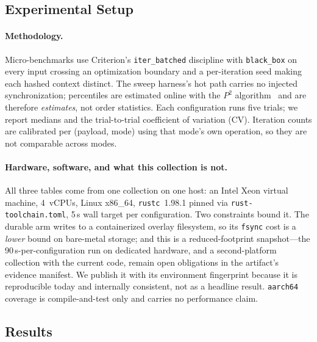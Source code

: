 \subsection{Experimental Setup}
\label{sec:setup}

\paragraph*{Methodology.}
Micro-benchmarks use Criterion's \texttt{iter\_batched} discipline with
\texttt{black\_box} on every input crossing an optimization boundary and a
per-iteration seed making each hashed context distinct.  The sweep
harness's hot path carries no injected synchronization; percentiles are
estimated online with the $P^2$ algorithm~\cite{jain1985p2} and are
therefore \emph{estimates}, not order statistics.  Each configuration runs
five trials; we report medians and the trial-to-trial coefficient of
variation (CV).  Iteration counts are calibrated per (payload, mode) using
that mode's own operation, so they are not comparable across modes.

\paragraph*{Hardware, software, and what this collection is not.}
All three tables come from one collection on one host: an Intel Xeon
virtual machine, 4~vCPUs, Linux x86\_64, \texttt{rustc}~1.98.1 pinned via
\texttt{rust-toolchain.toml}, 5\,s wall target per configuration.  Two
constraints bound it.  The durable arm writes to a containerized overlay
filesystem, so its \texttt{fsync} cost is a \emph{lower} bound on
bare-metal storage; and this is a reduced-footprint snapshot---the
90\,s-per-configuration run on dedicated hardware, and a second-platform
collection with the current code, remain open obligations in the
artifact's evidence manifest.  We publish it with its environment
fingerprint because it is reproducible today and internally consistent,
not as a headline result.  \texttt{aarch64} coverage is compile-and-test
only and carries no performance claim.

\subsection{Results}
\label{sec:results}

